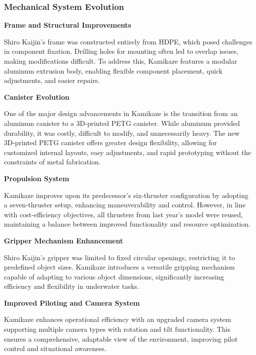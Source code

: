 \subsubsection{Mechanical System Evolution}
\vspace{0pt}
\textbf{Frame and Structural Improvements}

Shiro Kaijin’s frame was constructed entirely from HDPE, which posed challenges in component fixation. Drilling holes for mounting often led to overlap issues, making modifications difficult. To address this, Kamikaze features a modular aluminum extrusion body, enabling flexible component placement, quick adjustments, and easier repairs.

\vspace{0.2cm}
\textbf{Canister Evolution}

One of the major design advancements in Kamikaze is the transition from an aluminum canister to a 3D-printed PETG canister. While aluminum provided durability, it was costly, difficult to modify, and unnecessarily heavy. The new 3D-printed PETG canister offers greater design flexibility, allowing for customized internal layouts, easy adjustments, and rapid prototyping without the constraints of metal fabrication.

\vspace{0.2cm}
\textbf{Propulsion System}

Kamikaze improves upon its predecessor’s six-thruster configuration by adopting a seven-thruster setup, enhancing maneuverability and control. However, in line with cost-efficiency objectives, all thrusters from last year’s model were reused, maintaining a balance between improved functionality and resource optimization.

\vspace{0.2cm}
\textbf{Gripper Mechanism Enhancement}

Shiro Kaijin’s gripper was limited to fixed circular openings, restricting it to predefined object sizes. Kamikaze introduces a versatile gripping mechanism capable of adapting to various object dimensions, significantly increasing efficiency and flexibility in underwater tasks.

\vspace{0.2cm}
\textbf{Improved Piloting and Camera System}

Kamikaze enhances operational efficiency with an upgraded camera system supporting multiple camera types with rotation and tilt functionality. This ensures a comprehensive, adaptable view of the environment, improving pilot control and situational awareness.

